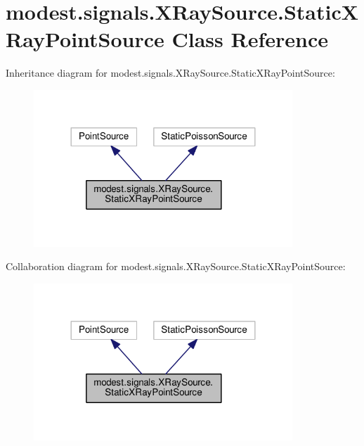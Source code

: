 \hypertarget{classmodest_1_1signals_1_1XRaySource_1_1StaticXRayPointSource}{}\section{modest.\+signals.\+X\+Ray\+Source.\+Static\+X\+Ray\+Point\+Source Class Reference}
\label{classmodest_1_1signals_1_1XRaySource_1_1StaticXRayPointSource}


Inheritance diagram for modest.\+signals.\+X\+Ray\+Source.\+Static\+X\+Ray\+Point\+Source\+:
\nopagebreak
\begin{figure}[H]
\begin{center}
\leavevmode
\includegraphics[width=276pt]{classmodest_1_1signals_1_1XRaySource_1_1StaticXRayPointSource__inherit__graph}
\end{center}
\end{figure}


Collaboration diagram for modest.\+signals.\+X\+Ray\+Source.\+Static\+X\+Ray\+Point\+Source\+:
\nopagebreak
\begin{figure}[H]
\begin{center}
\leavevmode
\includegraphics[width=276pt]{classmodest_1_1signals_1_1XRaySource_1_1StaticXRayPointSource__coll__graph}
\end{center}
\end{figure}
